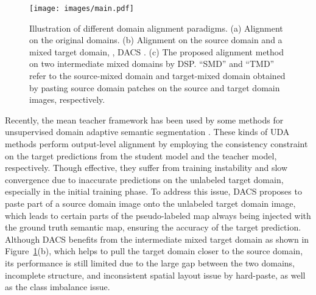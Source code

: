 \documentclass[sigconf]{acmart}
\begin{document}
\begin{figure}[t]
    \centering
    \texttt{[image: images/main.pdf]}
    \caption{Illustration of different domain alignment paradigms. (a) Alignment on the original domains. (b) Alignment on the source domain and a mixed target domain, , DACS \cite{dacs}. (c) The proposed alignment method on two intermediate mixed domains by DSP. ``SMD'' and ``TMD'' refer to the source-mixed domain and target-mixed domain obtained by pasting source domain patches on the source and target domain images, respectively.
    }
    \label{main}
\end{figure}

Recently, the mean teacher framework \cite{meanteacher} has been used by some methods for unsupervised domain adaptive semantic segmentation \cite{crdoco,TGCF}. These kinds of UDA methods perform output-level alignment by employing the consistency constraint on the target predictions from the student model and the teacher model, respectively. Though effective, they suffer from training instability and slow convergence due to inaccurate predictions on the unlabeled target domain, especially in the initial training phase. To address this issue, DACS \cite{dacs} proposes to paste part of a source domain image onto the unlabeled target domain image, which leads to certain parts of the pseudo-labeled map always being injected with the ground truth semantic map, ensuring the accuracy of the target prediction. Although DACS benefits from the intermediate mixed target domain as shown in Figure~\ref{main}(b), which helps to pull the target domain closer to the source domain, its performance is still limited due to the large gap between the two domains, incomplete structure, and inconsistent spatial layout issue by hard-paste, as well as the class imbalance issue.
\end{document}
